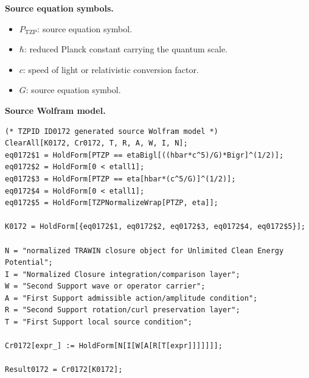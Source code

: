 \begin{minipage}[t]{0.49\linewidth}
\begingroup
\small
\raggedright
\textbf{Source equation symbols.}\par
\begin{itemize}[leftmargin=1.35em,itemsep=1pt,topsep=1pt,parsep=0pt]
    \item $P_{\mathrm{TZP}}$: source equation symbol.
    \item $\hbar$: reduced Planck constant carrying the quantum scale.
    \item $c$: speed of light or relativistic conversion factor.
    \item $G$: source equation symbol.
\end{itemize}
\endgroup
\end{minipage}\hfill
\begin{minipage}[t]{0.47\linewidth}
\begingroup
\scriptsize
\raggedright
\textbf{Source Wolfram model.}\par
\begin{Verbatim}[fontsize=\tiny,breaklines=true,breakanywhere=true]
(* TZPID ID0172 generated source Wolfram model *)
ClearAll[K0172, Cr0172, T, R, A, W, I, N];
eq0172$1 = HoldForm[PTZP == etaBigl[((hbar*c^5)/G)*Bigr]^(1/2)];
eq0172$2 = HoldForm[0 < etall1];
eq0172$3 = HoldForm[PTZP == eta[hbar*(c^5/G)]^(1/2)];
eq0172$4 = HoldForm[0 < etall1];
eq0172$5 = HoldForm[TZPNormalizeWrap[PTZP, eta]];

K0172 = HoldForm[{eq0172$1, eq0172$2, eq0172$3, eq0172$4, eq0172$5}];

N = "normalized TRAWIN closure object for Unlimited Clean Energy Potential";
I = "Normalized Closure integration/comparison layer";
W = "Second Support wave or operator carrier";
A = "First Support admissible action/amplitude condition";
R = "Second Support rotation/curl preservation layer";
T = "First Support local source condition";

Cr0172[expr_] := HoldForm[N[I[W[A[R[T[expr]]]]]]];

Result0172 = Cr0172[K0172];
\end{Verbatim}
\endgroup
\end{minipage}

